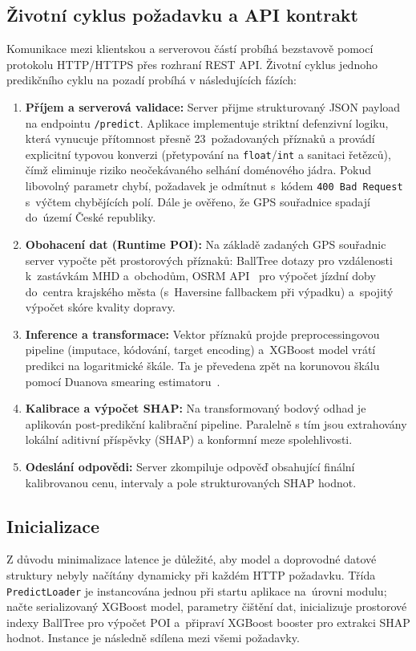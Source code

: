 \subsection*{Životní cyklus požadavku a API kontrakt}
Komunikace mezi klientskou a serverovou částí probíhá bezstavově pomocí protokolu HTTP/HTTPS přes rozhraní REST API. Životní cyklus jednoho predikčního cyklu na pozadí probíhá v následujících fázích:
\begin{enumerate}
    \item \textbf{Příjem a serverová validace:} Server přijme strukturovaný JSON payload na endpointu \texttt{/predict}. Aplikace implementuje striktní defenzivní logiku, která vynucuje přítomnost přesně 23~požadovaných příznaků a provádí explicitní typovou konverzi (přetypování na \texttt{float}/\texttt{int} a sanitaci řetězců), čímž eliminuje riziko neočekávaného selhání doménového jádra. Pokud libovolný parametr chybí, požadavek je odmítnut s~kódem \texttt{400 Bad Request} s~výčtem chybějících polí. Dále je ověřeno, že GPS souřadnice spadají do~území České republiky.
    \item \textbf{Obohacení dat (Runtime POI):} Na základě zadaných GPS souřadnic server vypočte pět prostorových příznaků: BallTree dotazy pro vzdálenosti k~zastávkám MHD a~obchodům, OSRM API~\cite{OSRM} pro výpočet jízdní doby do~centra krajského města (s~Haversine fallbackem při výpadku) a~spojitý výpočet skóre kvality dopravy.
    \item \textbf{Inference a transformace:} Vektor příznaků projde preprocessingovou pipeline (imputace, kódování, target encoding) a~XGBoost model vrátí predikci na logaritmické škále. Ta je převedena zpět na korunovou škálu pomocí Duanova smearing estimatoru~\cite{Duan1983Smearing}.
    \item \textbf{Kalibrace a výpočet SHAP:} Na transformovaný bodový odhad je aplikován post-predikční kalibrační pipeline. Paralelně s tím jsou extrahovány lokální aditivní příspěvky (SHAP) a konformní meze spolehlivosti.
    \item \textbf{Odeslání odpovědi:} Server zkompiluje odpověď obsahující finální kalibrovanou cenu, intervaly a pole strukturovaných SHAP hodnot.
\end{enumerate}


\subsection*{Inicializace}
Z důvodu minimalizace latence je důležité, aby model a doprovodné datové struktury nebyly načítány dynamicky při každém HTTP požadavku. Třída \texttt{PredictLoader} je instancována jednou při startu aplikace na~úrovni modulu; načte serializovaný XGBoost model, parametry čištění dat, inicializuje prostorové indexy BallTree pro výpočet POI a~připraví XGBoost booster pro extrakci SHAP hodnot. Instance je následně sdílena mezi všemi požadavky.

